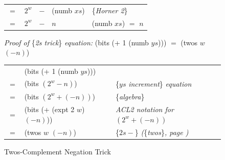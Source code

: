 \begin{figure}
\begin{center}
\begin{tabular} {rlcll}
$=$ & $2^w$ &$-$ &\textsf{(numb $xs$)}                                          & \{\emph{Horner 2}\}   \\
$=$ & $2^w$ &$-$ &$n$                                                           & \textsf{(numb $xs$)} $=$ $n$     \\
\end{tabular}
\end{center}
\emph{Proof of} \{\emph{2s trick}\} \emph{equation:} \textsf{(bits (+ 1 (numb $ys$)))} $=$ \textsf{(twos $w$ $(- n)$)}
\begin{center}
\begin{tabular} {lll}
    & \textsf{(bits (+ 1 (numb $ys$)))}        & \\
$=$ & \textsf{(bits $(2^w - n)$)}              & \{$ys$ \emph{increment}\} \emph{equation} \\
$=$ & \textsf{(bits $(2^w + (- n))$)}          & \{\emph{algebra}\}                        \\
$=$ & \textsf{(bits (+ (expt 2 $w$) $(- n)$)}) & \emph{ACL2 notation for} $(2^w + (- n))$\\
$=$ & \textsf{(twos $w$ $(- n)$)}              & \{$2s-$\} \emph{(}\{\emph{twos}\}\emph{, page \pageref{twos-defun})} \\
\end{tabular}
\end{center}
\caption{Twos-Complement Negation Trick}
\label{fig:2s-comp-negation}
\end{figure}

